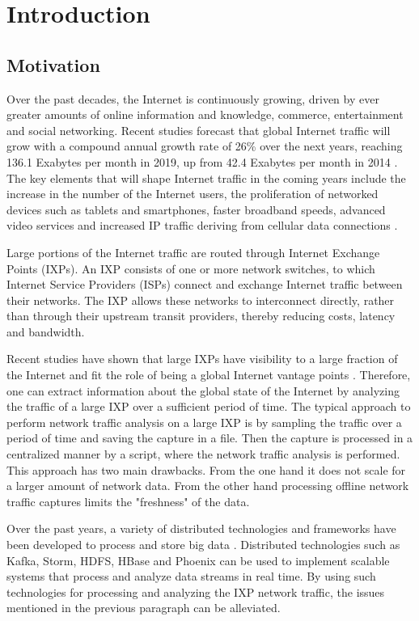 \chapter{Introduction}\label{chapter:introduction}

\section{Motivation}

Over the past decades, the Internet is continuously growing, driven by ever greater amounts of online information and knowledge, commerce, entertainment and social networking. Recent studies forecast that global Internet traffic will grow with a compound annual growth rate of 26\% over the next years, reaching 136.1 Exabytes per month in 2019, up from 42.4 Exabytes per month in 2014 \cite{cisco_2014}. The key elements that will shape Internet traffic in the coming years include the increase in the number of the Internet users, the proliferation of networked devices such as tablets and smartphones, faster broadband speeds, advanced video services and increased IP traffic deriving from cellular data connections \cite{cisco_press}.

Large portions of the Internet traffic are routed through Internet Exchange Points (IXPs). An IXP consists of one or more network switches, to which Internet Service Providers (ISPs) connect and exchange Internet traffic between their networks. The IXP allows these networks to interconnect directly, rather than through their upstream transit providers, thereby reducing costs, latency and bandwidth. 

Recent studies have shown that large IXPs have visibility to a large fraction of the Internet and fit the role of being a global Internet vantage points \cite{smaragdakis}. Therefore, one can extract information about the global state of the Internet by analyzing the traffic of a large IXP over a sufficient period of time. The typical approach to perform network traffic analysis on a large IXP is by sampling the traffic over a period of time and saving the capture in a file. Then the capture is processed in a centralized manner by a script, where the network traffic analysis is performed. This approach has two main drawbacks. From the one hand it does not scale for a larger amount of network data. From the other hand processing offline network traffic captures limits the "freshness" of the data.

Over the past years, a variety of distributed technologies and frameworks have been developed to process and store big data \cite{hadoop,storm,hbase}. Distributed technologies such as Kafka, Storm, HDFS, HBase and Phoenix can be used to implement scalable systems that process and analyze data streams in real time. By using such technologies for processing and analyzing the IXP network traffic, the issues mentioned in the previous paragraph can be alleviated. 



